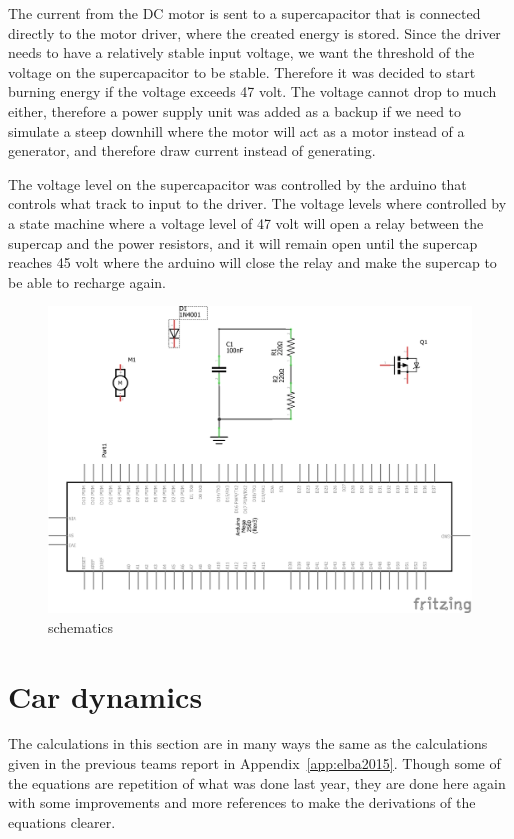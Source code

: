 The current from the DC motor is sent to a supercapacitor that is connected directly to the motor driver, where the created energy is stored. Since the driver needs to have a relatively stable input voltage, we want the threshold of the voltage on the supercapacitor to be stable. Therefore it was decided to start burning energy if the voltage exceeds 47 volt. The voltage cannot drop to much either, therefore a power supply unit was added as a backup if we need to simulate a steep downhill where the motor will act as a motor instead of a generator, and therefore draw current instead of generating. 

The voltage level on the supercapacitor was controlled by the arduino that controls what track to input to the driver. The voltage levels where controlled by a state machine where a voltage level of 47 volt will open a relay between the supercap and the power resistors, and it will remain open until the supercap reaches 45 volt where the arduino will close the relay and make the supercap to be able to recharge again. 


\begin{figure}[H]
    \centering
    \label{fig:bildeen}
    \includegraphics[width=1\textwidth]{./img/bildeen}
    \caption{schematics}
\end{figure}

\section{Car dynamics} \label{sec:cardynamics}
The calculations in this section are in many ways the same as the calculations
given in the previous teams report in Appendix~\ref{app:elba2015}. Though some
of the equations are repetition of what was done last year, they are
done here again with some improvements and more references to make the
derivations of the equations clearer.

